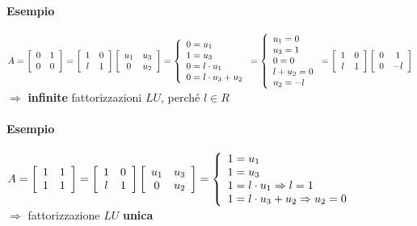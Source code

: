\documentclass[10pt]{book}
\begin{document}
\paragraph{Esempio} \begin{math}
A = \left[
\begin{array}{c c}
	0 & 1\\
	0 & 0
\end{array}
\right]
= \left[
\begin{array}{c c}
	1 & 0\\
	l & 1
\end{array}
\right]
\left[
\begin{array}{c c}
	u_1 & u_3\\
	0 & u_2
\end{array}
\right]
= \left\{
\begin{array}{l}
	0 = u_1\\
	1 = u_3\\
	0 = l\cdot u_1\\
	0 = l\cdot u_3 + u_2
\end{array}
\right.
= \left\{
\begin{array}{l}
	u_1 = 0\\
	u_3 = 1\\
	0 = 0\\
	l + u_2 = 0\\
	u_2 = -l
\end{array}
\right.
= \left[
\begin{array}{c c}
	1 & 0\\
	l & 1
\end{array}
\right]
\left[
\begin{array}{c c}
	0 & 1\\
	0 & -l
\end{array}
\right]
\end{math}\\
$\Rightarrow$ \textbf{infinite} fattorizzazioni $LU$, perché $l \in R$
\paragraph{Esempio} \begin{math}
A = \left[
\begin{array}{c c}
	1 & 1\\
	1 & 1
\end{array}
\right]
= \left[
\begin{array}{c c}
	1 & 0\\
	l & 1
\end{array}
\right]
\left[
\begin{array}{c c}
	u_1 & u_3\\
	0 & u_2
\end{array}
\right]
= \left\{
\begin{array}{l}
	1 = u_1\\
	1 = u_3\\
	1 = l\cdot u_1 \Rightarrow l = 1\\
	1 = l\cdot u_3 + u_2 \Rightarrow u_2 = 0
\end{array}
\right.
\end{math}\\
$\Rightarrow$ fattorizzazione $LU$ \textbf{unica}
\end{document}
